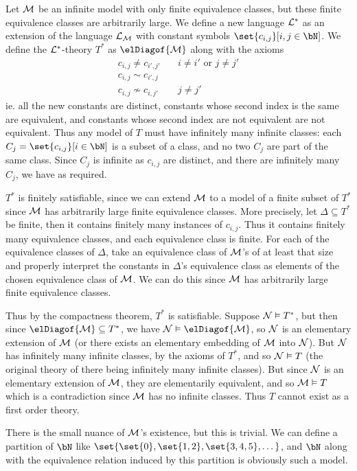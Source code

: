 \documentclass[10pt]{article}
\def\mL{{\cal L}}
\def\mM{{\cal M}}
\def\mN{{\cal N}}
\begin{document}
Let $\mM$ be an infinite model with only finite equivalence classes, but these finite equivalence classes are arbitrarily large.
We define a new language $\mL^*$ as an extension of the language $\mL_\mM$ with constant symbols $\set{c_{i,j}}[i,j\in\bN]$.
We define the $\mL^*$-theory $T^*$ as $\elDiagof\mM$ along with the axioms
\begin{align*}
    c_{i,j}\neq c_{i',j'} &\quad i\neq i'\text{ or }j\neq j'\\
    c_{i,j}\sim c_{i',j} \\
    c_{i,j}\not\sim c_{i,j'} &\quad j\neq j'
\end{align*}
ie. all the new constants are distinct, constants whose second index is the same are equivalent, and constants whose second index are not equivalent are not equivalent.
Thus any model of $T$ must have infinitely many infinite classes: each $C_j=\set{c_{i,j}}[i\in\bN]$ is a subset of a class, and no two $C_j$ are part of the same class.
Since $C_j$ is infinite as $c_{i,j}$ are distinct, and there are infinitely many $C_j$, we have as required.

$T^*$ is finitely satisfiable, since we can extend $\mM$ to a model of a finite subset of $T^*$ since $\mM$ has arbitrarily large finite equivalence classes.
More precisely, let $\Delta\subseteq T^*$ be finite, then it contains finitely many instances of $c_{i,j}$.
Thus it contains finitely many equivalence classes, and each equivalence class is finite.
For each of the equivalence classes of $\Delta$, take an equivalence class of $\mM$'s of at least that size and properly interpret the constants in $\Delta$'s equivalence class as elements of the chosen
equivalence class of $\mM$.
We can do this since $\mM$ has arbitrarily large finite equivalence classes.

Thus by the compactness theorem, $T^*$ is satisfiable.
Suppose $\mN\vDash T^*$, but then since $\elDiagof\mM\subseteq T^*$, we have $\mN\vDash\elDiagof\mM$, so $\mN$ is an elementary extension of $\mM$ (or there exists an elementary embedding of $\mM$ into
$\mN$).
But $\mN$ has infinitely many infinite classes, by the axioms of $T^*$, and so $\mN\vDash T$ (the original theory of there being infinitely many infinite classes).
But since $\mN$ is an elementary extension of $\mM$, they are elementarily equivalent, and so $\mM\vDash T$ which is a contradiction since $\mM$ has no infinite classes.
Thus $T$ cannot exist as a first order theory.

There is the small nuance of $\mM$'s existence, but this is trivial.
We can define a partition of $\bN$ like $\set{\set{0}, \set{1,2}, \set{3,4,5},\dots}$, and $\bN$ along with the equivalence relation induced by this partition is obviously such a model.
\end{document}
